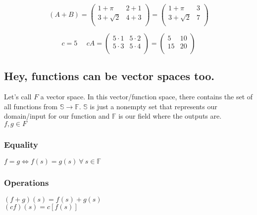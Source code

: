 \documentclass[11pt]{scrartcl}
\begin{document}
\begin{equation*}
(A + B) =  
\begin{pmatrix}
1 + \pi & 2 + 1 \\
3 + \sqrt{2} & 4 + 3 \\
\end{pmatrix}
= 
\begin{pmatrix}
1 + \pi & 3\\
3 + \sqrt{2} & 7\\
\end{pmatrix}
\end{equation*}

\begin{equation*}
c = 5 \ \ \ \ \ \ cA = 
\begin{pmatrix}
5 \cdot 1 & 5 \cdot 2 \\
5 \cdot 3 & 5 \cdot 4 \\
\end{pmatrix}
= 
\begin{pmatrix}
5 & 10\\
15 & 20\\
\end{pmatrix}
\end{equation*}

\subsection{Hey, functions can be vector spaces too.}
Let's call $F$ a vector space. In this vector/function space, there contains the set of all functions from $\mathbb{S} \rightarrow \mathbb{F}$.
$\mathbb{S}$ is just a nonempty set that represents our domain/input for our function and $\mathbb{F}$ is our field where the outputs are.\\ 
$f,g \in F$
\subsubsection{Equality}
$f = g \Leftrightarrow f(s) = g(s) \ \forall \ s \in \mathbb{F}$
\subsubsection{Operations}
$(f + g)(s) = f(s) + g(s)$\\
$(cf)(s) = c[f(s)]$
\end{document}
